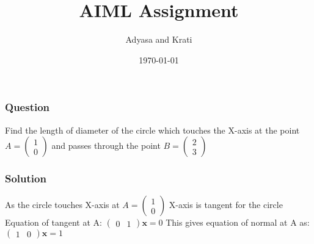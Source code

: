 \documentclass{beamer}
\title{AIML Assignment}
\author{Adyasa and Krati}
\institute{IIT Hyderabad}
\date{\today}
\begin{document}
\begin{frame}
\titlepage
\end{frame}

\begin{frame}

\frametitle{Question}
Find the length of diameter of the circle which touches the X-axis at the point
$A=\begin{pmatrix}
1\\
0\end{pmatrix}$ and passes through the point $B=\begin{pmatrix}
2\\
3\end{pmatrix}$

\end{frame}

\begin{frame}\center
\frametitle{Solution}

As the circle touches X-axis at $A = \begin{pmatrix}
1\\
0\end{pmatrix}$
\linebreak
\linebreak X-axis is tangent for the circle
\linebreak
\linebreak Equation of tangent at A:
\linebreak
\linebreak $ \begin{pmatrix}
0 & 1\end{pmatrix}\textbf{x} = 0$
\linebreak
\linebreak This gives equation of normal at A as:
\linebreak
\linebreak $\begin{pmatrix}
1 & 0\end{pmatrix}\textbf{x} = 1$

\end{frame}
\end{document}
